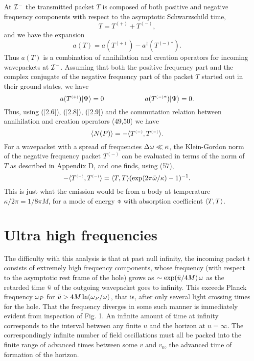 At ${\cal I}^-$ the transmitted packet $T$ is composed of both
positive and negative frequency components with respect to the
asymptotic Schwarzschild time,
\begin{equation}
T=T^{\scriptscriptstyle (+)}+T^{\scriptscriptstyle (-)},
\end{equation}
and we have the expansion
\begin{equation} a(T)=a(T^{\scriptscriptstyle (+)})-
a^{\dagger}(T^{\scriptscriptstyle (-)}{}^*).
\label{2.8}
\end{equation}
Thus $a(T)$ is a combination of annihilation and creation
operators for incoming wavepackets at ${\cal I}^-$.
Assuming that both the positive frequency part and the complex
conjugate of the negative frequency part of the packet $T$
started out in their ground states, we have
\begin{equation}
a(T^{\scriptscriptstyle (+)})|\Psi\rangle=0\qquad\qquad\qquad
a(T^{\scriptscriptstyle (-)}{}^*)|\Psi\rangle=0.
\label{2.9}
\end{equation}
Thus, using (\ref{2.6}), (\ref{2.8}), (\ref{2.9}) and the
commutation relation between
annihilation and creation operators (49,50) we have
\begin{equation} \langle N(P)\rangle =
-\langle T^{\scriptscriptstyle (-)},T^{\scriptscriptstyle (-)}\rangle.
\end{equation}
For a wavepacket with a spread of frequencies
$\Delta\omega\ll\kappa$, the Klein-Gordon norm of the negative frequency
packet $T^{\scriptscriptstyle (-)}$ can be evaluated in terms of
the norm of $T$ as described in Appendix D, and one finds,
using (57),
\begin{equation}
-\langle T^{\scriptscriptstyle (-)},T^{\scriptscriptstyle (-)}\rangle
=\langle T,T\rangle (\exp(2\pi\bar{\omega}/\kappa)-1)^{-1}.
\label{2.11}
\end{equation}
This is just what the emission would be from a body at
temperature $\kappa/2\pi=1/8\pi M$, for a mode of energy $\obar$
with absorption coefficient $\langle T,T\rangle$.
\section{Ultra high frequencies}
\label{sec:3}

The difficulty with this analysis is that at past null infinity,
the incoming packet $t$ consists of extremely high frequency
components, whose frequency (with respect to the asymptotic rest
frame of the hole) grows as $\sim\exp(\bar{u}/4M)\, \omega$ as the
retarded time $\bar{u}$ of the outgoing wavepacket goes to
infinity. This exceeds Planck frequency $\omega_P$ for $\bar{u}>4M
\ln(\omega_P/\omega)$, that is, after only several light
crossing times for the hole. That the frequency diverges in
some such manner is immediately evident from inspection of
Fig. 1. An infinite amount of time at infinity corresponds
to the interval between any finite $u$ and the horizon at
$u=\infty$. The correspondingly infinite number of field
oscillations must all be packed into the finite range of
advanced times between some $v$ and $v_0$, the advanced time of
formation of the horizon.

